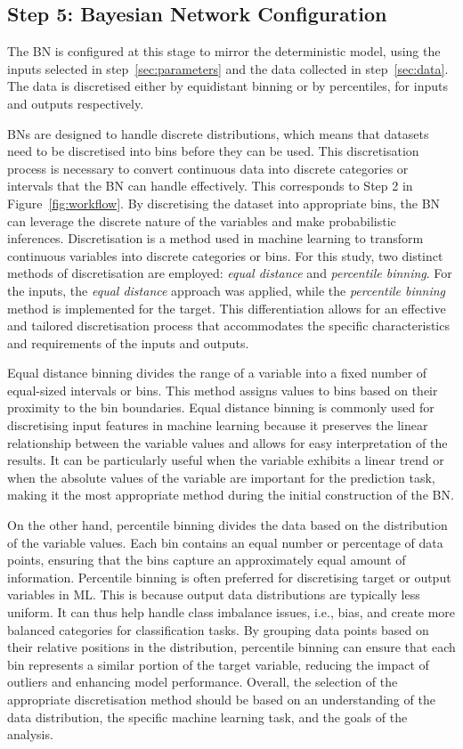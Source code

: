 \documentclass[journal]{IEEEtran}
\begin{document}
\subsection{\textbf{Step 5}: Bayesian Network Configuration}\label{sec:BNconfiguration}

The BN is configured at this stage to mirror the deterministic model, using the inputs selected in step~\ref{sec:parameters} and the data collected in step~\ref{sec:data}. The data is discretised either by equidistant binning or by percentiles, for inputs and outputs respectively.

BNs are designed to handle discrete distributions, which means that datasets need to be discretised into bins before they can be used. This discretisation process is necessary to convert continuous data into discrete categories or intervals that the BN can handle effectively. This corresponds to Step 2 in Figure~\ref{fig:workflow}. By discretising the dataset into appropriate bins, the BN can leverage the discrete nature of the variables and make probabilistic inferences. Discretisation is a method used in machine learning to transform continuous variables into discrete categories or bins. For this study, two distinct methods of discretisation are employed: \textit{equal distance} and \textit{percentile binning}. For the inputs, the \textit{equal distance} approach was applied, while the \textit{percentile binning} method is implemented for the target. This differentiation allows for an effective and tailored discretisation process that accommodates the specific characteristics and requirements of the inputs and outputs.

Equal distance binning divides the range of a variable into a fixed number of equal-sized intervals or bins\@. This method assigns values to bins based on their proximity to the bin boundaries. Equal distance binning is commonly used for discretising input features in machine learning because it preserves the linear relationship between the variable values and allows for easy interpretation of the results. It can be particularly useful when the variable exhibits a linear trend or when the absolute values of the variable are important for the prediction task, making it the most appropriate method during the initial construction of the BN.\@ 

On the other hand, percentile binning divides the data based on the distribution of the variable values. Each bin contains an equal number or percentage of data points, ensuring that the bins capture an approximately equal amount of information. Percentile binning is often preferred for discretising target or output variables in ML. This is because output data distributions are typically less uniform. It can thus help handle class imbalance issues, i.e., bias, and create more balanced categories for classification tasks. By grouping data points based on their relative positions in the distribution, percentile binning can ensure that each bin represents a similar portion of the target variable, reducing the impact of outliers and enhancing model performance. Overall, the selection of the appropriate discretisation method should be based on an understanding of the data distribution, the specific machine learning task, and the goals of the analysis. 
\end{document}
